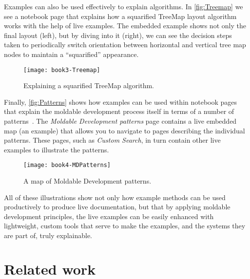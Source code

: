 \documentclass[sigplan,anonymous,review,10pt]{acmart}
\begin{document}
Examples can also be used effectively to explain algorithms.
In \autoref{fig:Treemap} we see a notebook page that explains how a squarified TreeMap layout algorithm works with the help of live examples.
The embedded example shows not only the final layout (left), but by diving into it (right), we can see the decision steps taken to periodically switch orientation between horizontal and vertical tree map nodes to maintain a ``squarified'' appearance.

\begin{figure}[h]
  \texttt{[image: book3-Treemap]}
  \caption{Explaining a squarified TreeMap algorithm.}
  \label{fig:Treemap}
\end{figure}

Finally, \autoref{fig:Patterns} shows how examples can be used within notebook pages that explain the moldable development process itself in terms of a number of patterns~\cite{Nier24a}.
The \emph{Moldable Development patterns} page contains a live embedded map (an example) that allows you to navigate to pages describing the individual patterns.
These pages, such as \emph{Custom Search}, in turn contain other live examples to illustrate the patterns.

\begin{figure}[h]
  \texttt{[image: book4-MDPatterns]}
  \caption{A map of Moldable Development patterns.}
  \label{fig:Patterns}
\end{figure}

All of these illustrations show not only how example methods can be used productively to produce live documentation, but that by applying moldable development principles, the live examples can be easily enhanced with lightweight, custom tools that serve to make the examples, and the systems they are part of, truly explainable.


\section{Related work}\label{sec:related}
\end{document}
